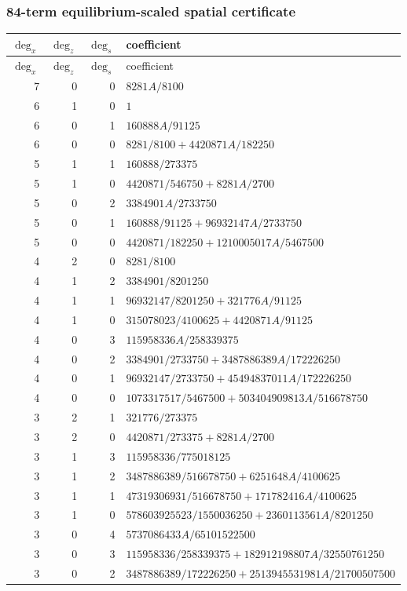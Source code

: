 \subsubsection*{84-term equilibrium-scaled spatial certificate}
\begin{longtable}{rrrl}
$\deg_{x}$ & $\deg_{z}$ & $\deg_{s}$ & coefficient\\
\toprule
\endfirsthead
$\deg_{x}$ & $\deg_{z}$ & $\deg_{s}$ & coefficient\\
\toprule
\endhead
7 & 0 & 0 & $8281A/8100$\\
6 & 1 & 0 & $1$\\
6 & 0 & 1 & $160888A/91125$\\
6 & 0 & 0 & $8281/8100+4420871A/182250$\\
5 & 1 & 1 & $160888/273375$\\
5 & 1 & 0 & $4420871/546750+8281A/2700$\\
5 & 0 & 2 & $3384901A/2733750$\\
5 & 0 & 1 & $160888/91125+96932147A/2733750$\\
5 & 0 & 0 & $4420871/182250+1210005017A/5467500$\\
4 & 2 & 0 & $8281/8100$\\
4 & 1 & 2 & $3384901/8201250$\\
4 & 1 & 1 & $96932147/8201250+321776A/91125$\\
4 & 1 & 0 & $315078023/4100625+4420871A/91125$\\
4 & 0 & 3 & $115958336A/258339375$\\
4 & 0 & 2 & $3384901/2733750+3487886389A/172226250$\\
4 & 0 & 1 & $96932147/2733750+45494837011A/172226250$\\
4 & 0 & 0 & $1073317517/5467500+503404909813A/516678750$\\
3 & 2 & 1 & $321776/273375$\\
3 & 2 & 0 & $4420871/273375+8281A/2700$\\
3 & 1 & 3 & $115958336/775018125$\\
3 & 1 & 2 & $3487886389/516678750+6251648A/4100625$\\
3 & 1 & 1 & $47319306931/516678750+171782416A/4100625$\\
3 & 1 & 0 & $578603925523/1550036250+2360113561A/8201250$\\
3 & 0 & 4 & $5737086433A/65101522500$\\
3 & 0 & 3 & $115958336/258339375+182912198807A/32550761250$\\
3 & 0 & 2 & $3487886389/172226250+2513945531981A/21700507500$\\

\end{longtable}
